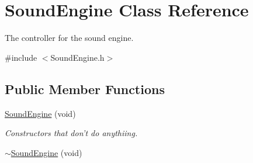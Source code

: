 \hypertarget{class_sound_engine}{\section{Sound\-Engine Class Reference}
\label{class_sound_engine}
}


The controller for the sound engine.  




{\ttfamily \#include $<$Sound\-Engine.\-h$>$}

\subsection*{Public Member Functions}
\begin{DoxyCompactItemize}
\item 
\hypertarget{class_sound_engine_ada066ddf9c7727d32f4f1a429af2ac77}{\hyperlink{class_sound_engine_ada066ddf9c7727d32f4f1a429af2ac77}{Sound\-Engine} (void)}\label{class_sound_engine_ada066ddf9c7727d32f4f1a429af2ac77}

\begin{DoxyCompactList}\small\item\em Constructors that don't do anythiing. \end{DoxyCompactList}\item 
\hypertarget{class_sound_engine_a05f462b806e47d0acd838a3747dcf53c}{\hyperlink{class_sound_engine_a05f462b806e47d0acd838a3747dcf53c}{$\sim$\-Sound\-Engine} (void)}\label{class_sound_engine_a05f462b806e47d0acd838a3747dcf53c}


\end{DoxyCompactItemize}
